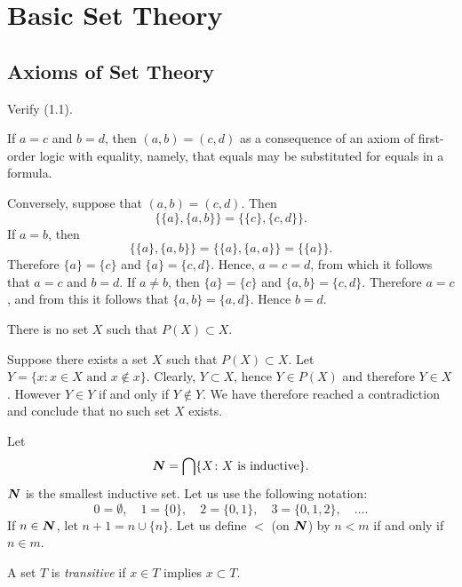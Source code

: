 \part{Basic Set Theory}

\chapter{Axioms of Set Theory}

 Verify (1.1).
\begin{solution}
  If $a = c$ and $b = d$, then $(a, b) = (c, d)$ as a consequence of an axiom of
  first-order logic with equality, namely, that equals may be substituted for
  equals in a formula.

  Conversely, suppose that $(a, b) = (c, d)$. Then
  \[
    \{ \{ a \}, \{ a, b \} \}  = \{ \{ c \}, \{ c, d \} \}.
  \]
  If $a = b$, then
  \[
    \{ \{ a \}, \{ a, b \} \} = \{ \{ a \}, \{ a, a \} \} = \{ \{ a \} \}.
  \]
  Therefore $\{ a \} = \{ c \}$ and  $\{ a \} = \{ c, d \}$. Hence, $a = c = d$,
  from which it follows that $a = c$ and $b = d$. If $a \neq b$, then
  $\{ a \} = \{ c \}$ and $\{ a, b \} = \{ c, d \}$. Therefore $a = c$, and from
  this it follows that $\{ a, b \} = \{ a, d \}$. Hence $b = d$.
\end{solution}

 There is no set $X$ such that $P(X) \subset X$.
\begin{solution}
  Suppose there exists a set $X$ such that $P(X) \subset X$. 
  Let $Y = \{ x : x \in X \text{ and } x \notin x \}$. Clearly, $Y \subset X$,
  hence $Y \in P(X)$ and therefore $Y \in X$. However $Y \in Y$ if and only if
  $Y \notin Y$. We have therefore reached a contradiction and conclude that no
  such set $X$ exists.
\end{solution}

Let
\[
  \boldsymbol{N} = \bigcap \{ X \colon X \text{ is inductive} \}.
\]
$\boldsymbol{N}$ is the smallest inductive set. Let us use the following notation:
\[
  0 = \emptyset, \quad
  1 = \{ 0 \}, \quad
  2 = \{ 0, 1 \}, \quad
  3 = \{ 0, 1, 2 \}, \quad
  \ldots.
\]
If $n \in \boldsymbol{N}$, let $ n + 1 = n \cup \{ n \}$. Let us define $<$ (on $\boldsymbol{N}$) by
$n < m$ if and only if $n \in m$.

A set $T$ is \emph{transitive} if $x \in T$ implies $x \subset T$.